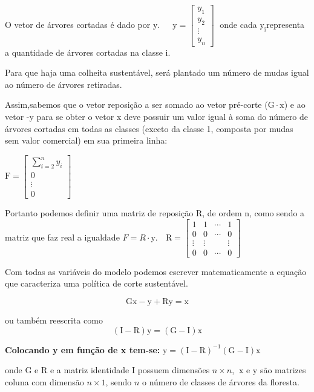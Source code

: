 \documentclass[a4paper, 12pt]{article}
\begin{document}
 O vetor de árvores cortadas é dado por $\mathrm{y}$. $\;\;\;$
$\mathrm{y} = 
  \begin{bmatrix}
  y_1 \\
  y_2 \\
  \vdots  \\
  y_n 
\end{bmatrix}\;$ onde cada $\mathrm{y_i}$representa a quantidade de árvores cortadas na classe i.
 
Para que haja uma colheita sustentável,  será plantado um número de mudas igual ao número de árvores retiradas.
 
Assim,sabemos que o vetor reposição a ser somado ao vetor pré-corte ($\mathrm{G \cdot x}$) e ao vetor -y para se obter o vetor x deve possuir um valor igual à soma do número de árvores cortadas em todas as classes (exceto da classe 1, composta por mudas sem valor comercial) em sua primeira linha:
 
$\mathrm{F} =
  \begin{bmatrix}
  \sum\limits_{i=2}^{n}y_i \\  0 \\
  \vdots  \\
  0 
  \end{bmatrix}$ 
 
Portanto podemos definir uma matriz de reposição $\mathrm{R}$, de ordem n, como sendo a matriz que faz real a igualdade $F=R\cdot \mathrm{y}$.
$\;$
$\mathrm{R} = 
 \begin{bmatrix}
  1 & 1 & \cdots & 1 \\
  0 & 0 & \cdots & 0 \\
  \vdots  & \vdots  &  & \vdots  \\
  0 & 0 & \cdots & 0 
 \end{bmatrix}$

Com todas as variáveis do modelo podemos escrever matematicamente a equação que caracteriza uma política de corte sustentável.
 
$$\mathrm{Gx} - \mathrm{y} + \mathrm{Ry} = \mathrm{x} $$ 
 
ou também reescrita como 
\begin{equation}\label{colheita_sustentavel_matricial}
    \mathrm{(I - R)y = (G-I)x} 
\end{equation}
 
\textbf{Colocando y em função de x tem-se:} $\mathrm{y = (I - R)^{-1}(G-I)x}$

onde $\mathrm{G}$ e $\mathrm {R}$ e a matriz identidade $\mathrm {I}$ possuem dimensões $n \times n$, $\: \mathrm {x}$ e $\mathrm {y}$ são matrizes coluna com dimensão $n \times 1$, sendo $n$ o número de classes de árvores da floresta.
\end{document}
